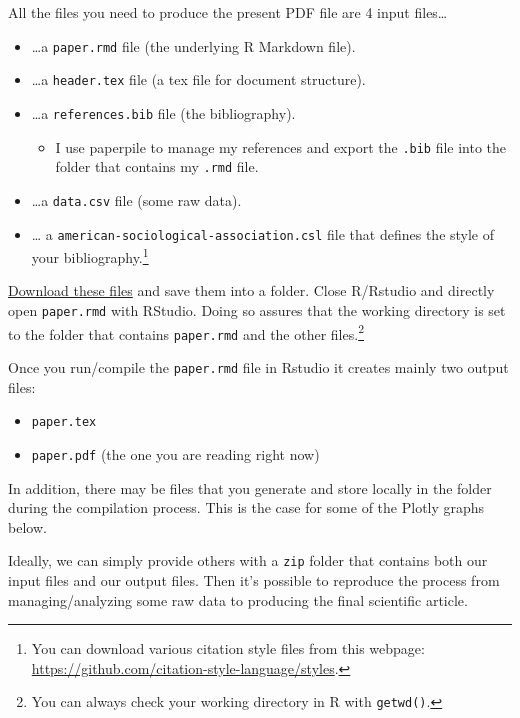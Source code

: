 \documentclass[12pt,]{article}
\providecommand{\tightlist}{%
  \setlength{\itemsep}{0pt}\setlength{\parskip}{0pt}}
\let\rmarkdownfootnote\footnote%
\def\footnote{\protect\rmarkdownfootnote}
\theoremstyle{definition}
\theoremstyle{definition}
\theoremstyle{definition}
\theoremstyle{remark}
\begin{document}
All the files you need to produce the present PDF file are 4 input
files\ldots{}

\begin{itemize}
\tightlist
\item
  \ldots{}a \texttt{paper.rmd} file (the underlying R Markdown file).
\item
  \ldots{}a \texttt{header.tex} file (a tex file for document
  structure).
\item
  \ldots{}a \texttt{references.bib} file (the bibliography).

  \begin{itemize}
  \tightlist
  \item
    I use paperpile to manage my references and export the \texttt{.bib}
    file into the folder that contains my \texttt{.rmd} file.
  \end{itemize}
\item
  \ldots{}a \texttt{data.csv} file (some raw data).
\item
  \ldots{} a \texttt{american-sociological-association.csl} file that
  defines the style of your bibliography.\footnote{You can download
    various citation style files from this webpage:
    \url{https://github.com/citation-style-language/styles}.}
\end{itemize}

\href{https://drive.google.com/drive/folders/1zJP3cNPrHN-gj0rcmbHQgg-XA0hqDXdd?usp=sharing}{Download
these files} and save them into a folder. Close R/Rstudio and directly
open \texttt{paper.rmd} with RStudio. Doing so assures that the working
directory is set to the folder that contains \texttt{paper.rmd} and the
other files.\footnote{You can always check your working directory in R
  with \texttt{getwd()}.}

Once you run/compile the \texttt{paper.rmd} file in Rstudio it creates
mainly two output files:

\begin{itemize}
\tightlist
\item
  \texttt{paper.tex}
\item
  \texttt{paper.pdf} (the one you are reading right now)
\end{itemize}

In addition, there may be files that you generate and store locally in
the folder during the compilation process. This is the case for some of
the Plotly graphs below.

Ideally, we can simply provide others with a \texttt{zip} folder that
contains both our input files and our output files. Then it's possible
to reproduce the process from managing/analyzing some raw data to
producing the final scientific article.
\end{document}
